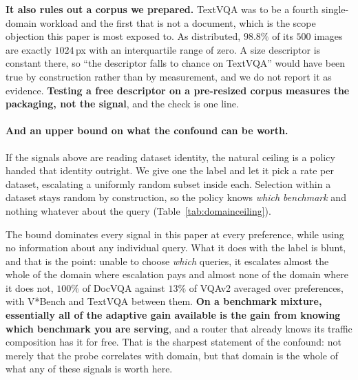 \documentclass[10pt,twocolumn]{article}
\theoremstyle{plain}
\begin{document}
\textbf{It also rules out a corpus we prepared.} TextVQA was to be a fourth
single-domain workload and the first that is not a document, which is the
scope objection this paper is most exposed to. As distributed, $98.8\%$ of its
$500$ images are exactly $1024$\,px with an interquartile range of zero. A size
descriptor is constant there, so ``the descriptor falls to chance on TextVQA''
would have been true by construction rather than by measurement, and we do not
report it as evidence. \textbf{Testing a free descriptor on a pre-resized
corpus measures the packaging, not the signal}, and the check is one line.

\paragraph{And an upper bound on what the confound can be worth.} If the
signals above are reading dataset identity, the natural ceiling is a policy
handed that identity outright. We give one the label and let it pick a rate per
dataset, escalating a uniformly random subset inside each. Selection within a
dataset stays random by construction, so the policy knows \emph{which
benchmark} and nothing whatever about the query (Table~\ref{tab:domainceiling}).

\begin{table}[t]
\centering\small
\setlength{\tabcolsep}{4pt}
\caption{What dataset identity alone buys, $30$ resampled folds. The first row
escalates a random subset within each dataset at a rate tuned per dataset on
the test fold, so it is an optimistic bound rather than a deployable policy.
The probe row is recomputed on these resamples and agrees with
Table~\ref{tab:freesignal} to within $0.005$.}
\label{tab:domainceiling}
\end{table}

The bound dominates every signal in this paper at every preference, while using
no information about any individual query. What it does with the label is
blunt, and that is the point: unable to choose \emph{which} queries, it
escalates almost the whole of the domain where escalation pays and almost none
of the domain where it does not, $100\%$ of DocVQA against $13\%$ of VQAv2
averaged over preferences, with V*Bench and TextVQA between them. \textbf{On a
benchmark mixture, essentially all of the adaptive gain available is the gain
from knowing which benchmark you are serving}, and a router that already knows
its traffic composition has it for free. That is the sharpest statement of the
confound: not merely that the probe correlates with domain, but that domain is
the whole of what any of these signals is worth here.
\end{document}
